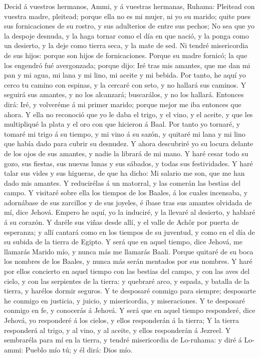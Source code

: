  Decid á vuestros hermanos, Ammi, y á vuestras hermanas,
Ruhama:  Pleitead con vuestra madre, pleitead; porque ella
no es mi mujer, ni yo su marido; quite pues sus fornicaciones de su
rostro, y sus adulterios de entre sus pechos;  No sea que yo
la despoje desnuda, y la haga tornar como el día en que nació, y la
ponga como un desierto, y la deje como tierra seca, y la mate de sed.
 Ni tendré misericordia de sus hijos: porque son hijos de
fornicaciones.  Porque su madre fornicó; la que los engendró
fué avergonzada; porque dijo: Iré tras mis amantes, que me dan mi pan y
mi agua, mi lana y mi lino, mi aceite y mi bebida.  Por
tanto, he aquí yo cerco tu camino con espinas, y la cercaré con seto, y
no hallará sus caminos.  Y seguirá sus amantes, y no los
alcanzará; buscarálos, y no los hallará. Entonces dirá: Iré, y volveréme
á mi primer marido; porque mejor me iba entonces que ahora. 
Y ella no reconoció que yo le daba el trigo, y el vino, y el aceite, y
que les multipliqué la plata y el oro con que hicieron á Baal.
 Por tanto yo tornaré, y tomaré mi trigo á su tiempo, y mi
vino á su sazón, y quitaré mi lana y mi lino que había dado para cubrir
su desnudez.  Y ahora descubriré yo su locura delante de
los ojos de sus amantes, y nadie la librará de mi mano.  Y
haré cesar todo su gozo, sus fiestas, sus nuevas lunas y sus sábados, y
todas sus festividades.  Y haré talar sus vides y sus
higueras, de que ha dicho: Mi salario me son, que me han dado mis
amantes. Y reducirélas á un matorral, y las comerán las bestias del
campo.  Y visitaré sobre ella los tiempos de los Baales, á
los cuales incensaba, y adornábase de sus zarcillos y de sus joyeles, é
íbase tras sus amantes olvidada de mí, dice Jehová.  Empero
he aquí, yo la induciré, y la llevaré al desierto, y hablaré á su
corazón.  Y daréle sus viñas desde allí, y el valle de
Achôr por puerta de esperanza; y allí cantará como en los tiempos de su
juventud, y como en el día de su subida de la tierra de Egipto.
 Y será que en aquel tiempo, dice Jehová, me llamarás
Marido mío, y nunca más me llamarás Baali.  Porque quitaré
de su boca los nombres de los Baales, y nunca más serán mentados por sus
nombres.  Y haré por ellos concierto en aquel tiempo con
las bestias del campo, y con las aves del cielo, y con las serpientes de
la tierra: y quebraré arco, y espada, y batalla de la tierra, y harélos
dormir seguros.  Y te desposaré conmigo para siempre;
desposarte he conmigo en justicia, y juicio, y misericordia, y
miseraciones.  Y te desposaré conmigo en fe, y conocerás á
Jehová.  Y será que en aquel tiempo responderé, dice
Jehová, yo responderé á los cielos, y ellos responderán á la tierra;
 Y la tierra responderá al trigo, y al vino, y al aceite, y
ellos responderán á Jezreel.  Y sembraréla para mí en la
tierra, y tendré misericordia de Lo-ruhama: y diré á Lo-ammi: Pueblo mío
tú; y él dirá: Dios mío.

